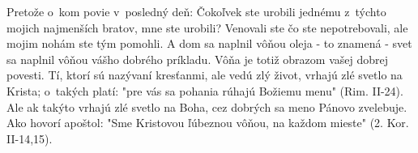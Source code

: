 Pretože o~kom povie v~posledný deň: Čokoľvek ste urobili jednému z~týchto mojich najmenších bratov, mne ste urobili? Venovali ste čo ste nepotrebovali, ale mojim nohám ste tým pomohli. A dom sa naplnil vôňou oleja - to znamená - svet sa naplnil vôňou vášho dobrého príkladu. Vôňa je totiž obrazom vašej dobrej povesti. Tí, ktorí sú nazývaní kresťanmi, ale vedú zlý život, vrhajú zlé svetlo na Krista; o~takých platí: "pre vás sa pohania rúhajú Božiemu menu" (Rim. II-24). Ale ak takýto vrhajú zlé svetlo na Boha, cez dobrých sa meno Pánovo zvelebuje.
Ako hovorí apoštol: "Sme Kristovou ľúbeznou vôňou, na každom mieste" (2. Kor. II-14,15).

